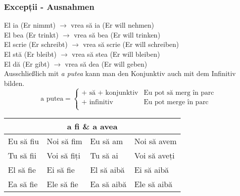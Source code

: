 \documentclass[11pt, oneside]{article}
\begin{document}
\subsubsection*{Excepții - Ausnahmen}
El ia (Er nimmt) $\rightarrow$ vrea să ia (Er will nehmen)\\
El bea (Er trinkt) $\rightarrow$ vrea să bea (Er will trinken)\\
El scrie (Er schreibt) $\rightarrow$ vrea să scrie (Er will schreiben)\\
El stă (Er bleibt) $\rightarrow$ vrea să stea (Er will bleiben)\\
El dă (Er gibt) $\rightarrow$ vrea să dea (Er will geben)\\
\newline
Ausschließlich mit \emph{a putea} kann man den Konjunktiv auch mit dem Infinitiv bilden. 
\begin{equation*}
  \text{a putea} =
  \begin{cases}
    \text{+ să + konjunktiv} & \text{Eu pot să merg în parc} \\
    \text{+ infinitiv} & \text{Eu pot merge în parc}\\
  \end{cases}
\end{equation*}

\begin{center}
  \begin{tabular}{ |p{3.25cm}|p{3.25cm}||p{3.25cm}|p{3.25cm}|  }
      \hline  
      \multicolumn{4}{|c|}{a fi \& a avea} \\
      \hline
      \hline
      Eu să fiu & Noi să fim & Eu să am & Noi să avem\\
      \hline
      Tu să fii & Voi să fiți & Tu să ai & Voi să aveți\\
      \hline
      El să fie& Ei să fie & El să aibă & Ei să aibă\\ 
      Ea să fie& Ele să fie & Ea să aibă & Ele să aibă\\
      \hline
     \end{tabular}
\end{center}

%
\end{document}
